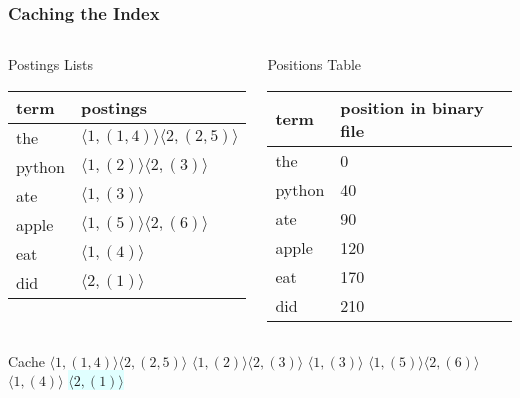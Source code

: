 \documentclass{beamer}
\begin{document}
\begin{frame}
  \frametitle{Caching the Index}

  \begin{columns}


    \begin{block}{Postings Lists}
      \begin{tabular}{ l | l }
        term & postings \\ \hline
        the & $ \langle 1,(1,4) \rangle \langle 2,(2,5) \rangle $ \\
        python & $ \langle 1,(2) \rangle \langle 2,(3) \rangle $ \\
        ate & $ \langle 1,(3) \rangle $ \\
        apple & $ \langle 1,(5) \rangle \langle 2,(6) \rangle $ \\
        eat & $ \langle 1,(4) \rangle $ \\
        \rowcolor{LightCyan}
        did & $ \langle 2,(1) \rangle $ \\
      \end{tabular}
    \end{block}


    \begin{block}{Positions Table}
      \begin{tabular}{ l | l }
        term & position in binary file \\ \hline
        the & 0 \\
        python & 40 \\
        ate & 90 \\
        apple & 120 \\
        eat & 170 \\
        \rowcolor{LightCyan}
        did & 210 \\
      \end{tabular}
    \end{block}
    
  \end{columns}

  \begin{block}{Cache}
    $ \langle 1,(1,4) \rangle \langle 2,(2,5) \rangle $
    $ \langle 1,(2) \rangle \langle 2,(3) \rangle $
    $ \langle 1,(3) \rangle $
    $ \langle 1,(5) \rangle \langle 2,(6) \rangle $
    $ \langle 1,(4) \rangle $
    \colorbox{LightCyan}{$ \langle 2,(1) \rangle $}
  \end{block}
\end{frame}
\end{document}

